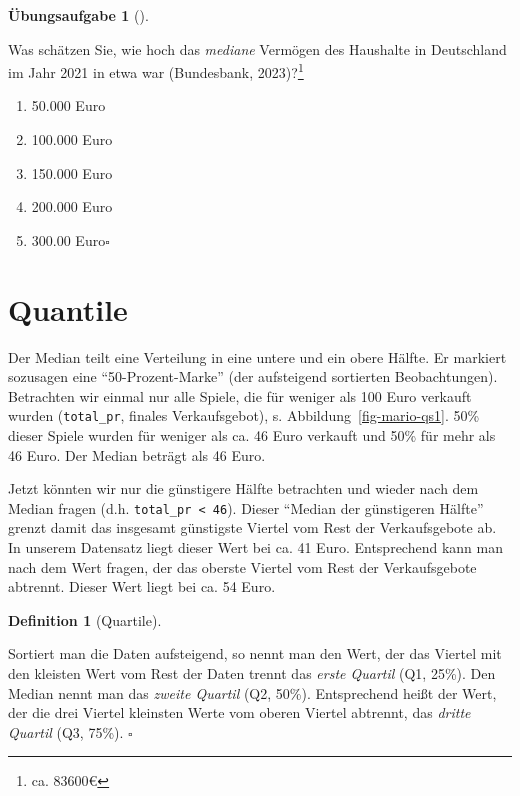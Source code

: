\documentclass[
  letterpaper,
]{scrbook}
\providecommand{\tightlist}{%
  \setlength{\itemsep}{0pt}\setlength{\parskip}{0pt}}\usepackage{longtable,booktabs,array}
\theoremstyle{definition}
\newtheorem{exercise}{Übungsaufgabe}[chapter]
\theoremstyle{definition}
\theoremstyle{definition}
\newtheorem{definition}{Definition}[chapter]
\theoremstyle{remark}
\begin{document}
\begin{exercise}[]\protect\hypertarget{exr-mw-wealthmd}{}\label{exr-mw-wealthmd}

Was schätzen Sie, wie hoch das \emph{mediane} Vermögen des Haushalte in
Deutschland im Jahr 2021 in etwa war (Bundesbank, 2023)?\footnote{ca.
  83600€}

\begin{enumerate}
\def\labelenumi{\alph{enumi})}
\tightlist
\item
  50.000 Euro
\item
  100.000 Euro
\item
  150.000 Euro
\item
  200.000 Euro
\item
  300.00 Euro\(\square\)
\end{enumerate}

\end{exercise}

\section{Quantile}\label{quantile}

Der Median teilt eine Verteilung in eine untere und ein obere Hälfte. Er
markiert sozusagen eine \enquote{50-Prozent-Marke} (der aufsteigend
sortierten Beobachtungen). Betrachten wir einmal nur alle Spiele, die
für weniger als 100 Euro verkauft wurden (\texttt{total\_pr}, finales
Verkaufsgebot), s. Abbildung~\ref{fig-mario-qs1}. 50\% dieser Spiele
wurden für weniger als ca. 46 Euro verkauft und 50\% für mehr als 46
Euro. Der Median beträgt als 46 Euro.

Jetzt könnten wir nur die günstigere Hälfte betrachten und wieder nach
dem Median fragen (d.h. \texttt{total\_pr\ \textless{}\ 46}). Dieser
\enquote{Median der günstigeren Hälfte} grenzt damit das insgesamt
günstigste Viertel vom Rest der Verkaufsgebote ab. In unserem Datensatz
liegt dieser Wert bei ca. 41 Euro. Entsprechend kann man nach dem Wert
fragen, der das oberste Viertel vom Rest der Verkaufsgebote abtrennt.
Dieser Wert liegt bei ca. 54 Euro.

\begin{definition}[Quartile]\protect\hypertarget{def-quartile}{}\label{def-quartile}

Sortiert man die Daten aufsteigend, so nennt man den Wert, der das
Viertel mit den kleisten Wert vom Rest der Daten trennt das \emph{erste
Quartil} (Q1, 25\%). Den Median nennt man das \emph{zweite Quartil} (Q2,
50\%). Entsprechend heißt der Wert, der die drei Viertel kleinsten Werte
vom oberen Viertel abtrennt, das \emph{dritte Quartil} (Q3, 75\%).
\(\square\)

\end{definition}
\end{document}
